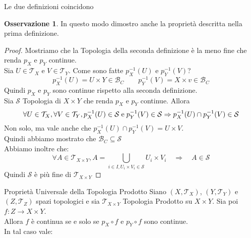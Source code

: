 \documentclass[11pt,a4paper,twoside]{article}
\theoremstyle{definition}
\newtheorem*{oss}{Osservazione}
\begin{document}
\begin{prop}{}{}
	Le due definizioni coincidono
\end{prop}

\begin{oss}
	In questo modo dimostro anche la proprietà descritta nella prima definizione.
\end{oss}

\begin{proof}
	Mostriamo che la Topologia della seconda definizione è la meno fine che renda $p_X$ e $p_Y$ continue.\\
	Sia $U \in \mathcal T_X$ e $V \in \mathcal T_Y$. Come sono fatte $p^{-1}_X(U)$ e $p^{-1}_Y(V)$?
	\[p^{-1}_X(U) = U \times Y \in \mathcal B_C \qquad p^{-1}_Y(V) = X \times v \in \mathcal B_C\]
	Quindi $p_X$ e $p_Y$ sono continue rispetto alla seconda definizione.\\
	Sia $\mathcal S$ Topologia di $X \times Y$ che renda $p_X$ e $p_Y$ continue. Allora
	\[ \forall U \in \mathcal T_X, \forall V \in \mathcal T_Y, p^{-1}_X(U) \in \mathcal S\; \text e \; p^{-1}_Y(V) \in \mathcal S \Rightarrow p^{-1}_X(U)\cap p^{-1}_Y(V) \in \mathcal S\]
	Non solo, ma vale anche che $p_X^{-1}(U) \cap p_Y^{-1}(V) = U \times V$.\\
	Quindi abbiamo mostrato che $\mathcal B_C \subseteq \mathcal S$\\
	Abbiamo inoltre che:
	\[\forall A \in \mathcal T_{X \times Y}, A = \bigcup_{i \in I, U_i \times V_i \in \mathcal S} U_i \times V_i \quad \Rightarrow \quad A \in \mathcal S\]
	Quindi $\mathcal S$ è più fine di $\mathcal T_{X \times Y}$
\end{proof}

\begin{cor}{Proprietà Universale della Topologia Prodotto}{}
	Siano $(X, \mathcal T_X)$, $(Y, \mathcal T_Y)$ e $(Z, \mathcal T_Z)$ spazi topologici e sia $\mathcal T_{X \times Y}$ Topologia Prodotto su $X \times Y$. Sia poi $f \colon Z \to X \times Y$.\\
	Allora $f$ è continua se e solo se $p_X \circ f$ e $p_Y \circ f$ sono continue.\\
	In tal caso vale:
	\begin{center}
	\end{center}
\end{cor}
\end{document}
